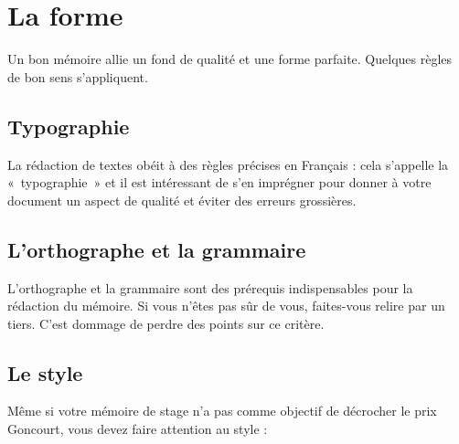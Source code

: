 \documentclass [twoside,openright,a4paper,11pt,french] {report}
\begin{document}

\chapter {La forme}
    \label {chap:contexte}

Un bon mémoire allie un fond de qualité et une forme parfaite. Quelques
règles de bon sens s'appliquent.

\section {Typographie}

La rédaction de textes obéit à des règles précises en
Français : cela s'appelle la «~typographie~» \cite{andre1990} et il
est intéressant de s'en imprégner pour donner à votre document un
aspect de qualité et éviter des erreurs grossières.

\section {L'orthographe et la grammaire}

L'orthographe et la grammaire sont des prérequis indispensables pour
la rédaction du mémoire. Si vous n'êtes pas sûr de vous, faites-vous
relire par un tiers. C'est dommage de perdre des points sur ce critère.

\section {Le style}

Même si votre mémoire de stage n'a pas comme objectif de décrocher
le prix Goncourt, vous devez faire attention au style :
\end{document}
